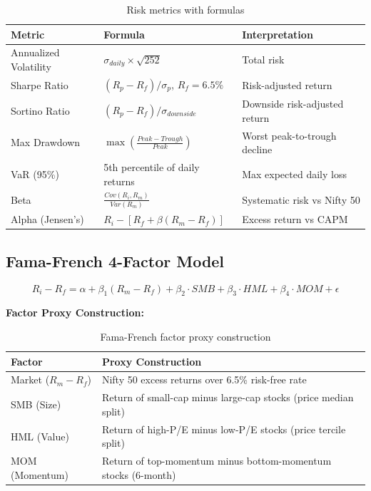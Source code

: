 \documentclass[12pt, a4paper, oneside]{report}
\begin{document}
\begin{table}[H]
\centering
\caption{Risk metrics with formulas}
\label{tab:risk_metrics}
\begin{tabularx}{\textwidth}{@{}l l X@{}}
\toprule
\textbf{Metric} & \textbf{Formula} & \textbf{Interpretation} \\
\midrule
Annualized Volatility & $\sigma_{daily} \times \sqrt{252}$ & Total risk \\
Sharpe Ratio & $(R_p - R_f) / \sigma_p$, $R_f = 6.5\%$ & Risk-adjusted return \\
Sortino Ratio & $(R_p - R_f) / \sigma_{downside}$ & Downside risk-adjusted return \\
Max Drawdown & $\max\left(\frac{Peak - Trough}{Peak}\right)$ & Worst peak-to-trough decline \\
VaR (95\%) & 5th percentile of daily returns & Max expected daily loss \\
Beta & $\frac{Cov(R_i, R_m)}{Var(R_m)}$ & Systematic risk vs Nifty 50 \\
Alpha (Jensen's) & $R_i - [R_f + \beta(R_m - R_f)]$ & Excess return vs CAPM \\
\bottomrule
\end{tabularx}
\end{table}

\subsection{Fama-French 4-Factor Model}

\begin{equation}
    R_i - R_f = \alpha + \beta_1(R_m - R_f) + \beta_2 \cdot SMB + \beta_3 \cdot HML + \beta_4 \cdot MOM + \epsilon
\end{equation}

\textbf{Factor Proxy Construction:}

\begin{table}[H]
\centering
\caption{Fama-French factor proxy construction}
\label{tab:ff_factors}
\begin{tabularx}{\textwidth}{@{}l X@{}}
\toprule
\textbf{Factor} & \textbf{Proxy Construction} \\
\midrule
Market ($R_m - R_f$) & Nifty 50 excess returns over 6.5\% risk-free rate \\
SMB (Size) & Return of small-cap minus large-cap stocks (price median split) \\
HML (Value) & Return of high-P/E minus low-P/E stocks (price tercile split) \\
MOM (Momentum) & Return of top-momentum minus bottom-momentum stocks (6-month) \\
\bottomrule
\end{tabularx}
\end{table}
\end{document}
